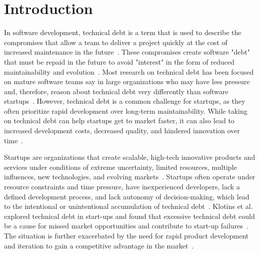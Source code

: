 
\section{Introduction}
In software development, technical debt is a term that is used to describe the compromises that allow a team to deliver a project quickly at the cost of increased maintenance in the future~\cite{Maldonado7332619}.
These compromises create software "debt" that must be repaid in the future to  avoid "interest" in the form of reduced maintainability and evolution~\cite{Seaman6225999}.
Most research on technical debt has been focused on mature software teams say in large organizations who may have less pressure and, therefore, reason about technical debt very differently than software startups~\cite{Besker2018,Li:2015}.
However, technical debt is a common challenge for startups, as they often prioritize rapid development over long-term maintainability.
While taking on technical debt can help startups get to market faster, it can also lead to increased development costs, decreased quality, and hindered innovation over time~\cite{Seaman6225999, DesignSt86:online}.

Startups are organizations that create scalable, high-tech innovative products and services under conditions of extreme uncertainty, limited resources, multiple influences, new technologies, and evolving markets~\cite{Unterkalmsteiner16}.
Startups often operate under resource constraints and time pressure, have inexperienced developers, lack a defined development process, and lack autonomy of decision-making, which lead to the intentional or unintentional accumulation of technical debt~\cite{Besker2018}.
Klotins et al. explored technical debt in start-ups and found that excessive technical debt could be a cause for missed market opportunities and contribute to start-up failures~\cite{Klotins:2018:ETD}.
The situation is further exacerbated by the need for rapid product development and iteration to gain a competitive advantage in the market~\cite{Cico0JNM20}.

